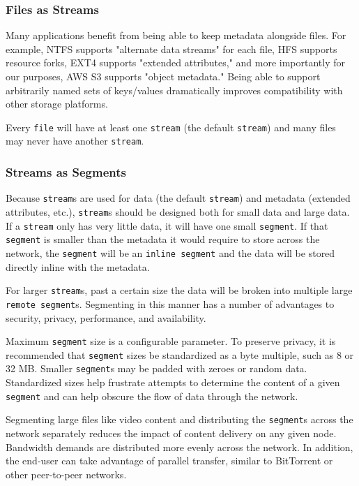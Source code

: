 \documentclass[a4paper,10pt]{article}
\newcommand{\x}[1]{{\tt #1}}
\begin{document}
\subsubsection{Files as Streams}

Many applications benefit from being able to keep metadata alongside files.
For example, NTFS supports "alternate data streams" for each file, HFS supports
resource forks, EXT4 supports "extended attributes," and more importantly for
our purposes, AWS S3 supports "object metadata."\cite{s3-object-meta} Being
able to support arbitrarily named sets of keys/values dramatically improves
compatibility with other storage platforms.

Every \x{file} will have at least one \x{stream} (the default \x{stream}) and
many files may never have another \x{stream}.

\subsubsection{Streams as Segments}

Because \x{stream}s are used for data (the default \x{stream}) and metadata
(extended attributes, etc.), \x{stream}s should be designed both for small data
and large data. If a \x{stream} only has very little data, it will have one
small \x{segment}. If that \x{segment} is smaller than the metadata it would
require to store across the network, the \x{segment} will be an
\x{inline segment} and the data will be stored directly inline with the
metadata.

For larger \x{stream}s, past a certain size the data will be broken into
multiple large \x{remote segment}s. Segmenting in this manner has a number of
advantages to security, privacy, performance, and availability.

Maximum \x{segment} size is a configurable parameter. To preserve privacy, it is
recommended that \x{segment} sizes be standardized as a byte multiple, such as 8
or 32 MB. Smaller \x{segment}s may be padded with zeroes or random data.
Standardized sizes help frustrate attempts to determine the content of a given
\x{segment} and can help obscure the flow of data through the network.

Segmenting large files like video content and distributing the \x{segment}s
across the network separately reduces the impact of content delivery on any
given node.
Bandwidth demands are distributed more evenly across the network. In addition,
the end-user can take advantage of parallel transfer, similar to
BitTorrent\cite{24} or other peer-to-peer networks.
\end{document}
